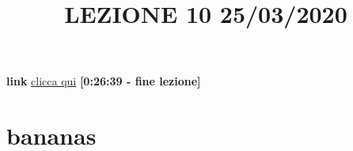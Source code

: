 \title{LEZIONE 10 25/03/2020}\newline
\textbf{link} \href{https://web.microsoftstream.com/video/562a82e0-19cc-4f81-9183-eee77c9c45a4?list=user&userId=faa91214-a6f5-40d7-8875-253fd49b8ce1}{clicca qui} \;\;\textbf{[0:26:39 - fine lezione]}
\section{bananas}